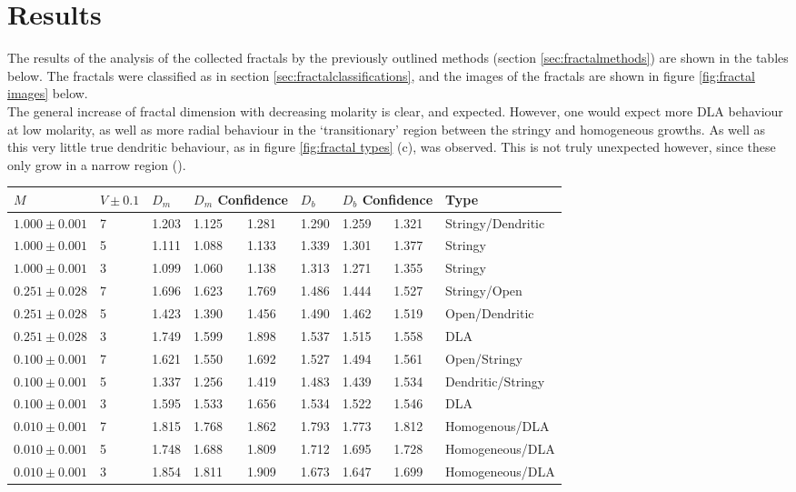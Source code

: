 \documentclass{article}
\theoremstyle{definition}
\theoremstyle{remark}
\begin{document}
\section{Results}
The results of the analysis of the collected fractals by the previously outlined methods (section \ref{sec:fractalmethods}) are shown in the tables below. The fractals were classified as in section \ref{sec:fractalclassifications}, and the images of the fractals are shown in figure \ref{fig:fractal images} below.\\
\indent The general increase of fractal dimension with decreasing molarity is clear, and expected. However, one would expect more DLA behaviour at low molarity, as well as more radial behaviour in the `transitionary' region between the stringy and homogeneous growths. As well as this very little true dendritic behaviour, as in figure \ref{fig:fractal types} (c), was observed. This is not truly unexpected however, since these only grow in a narrow region (\cite{PhysRevLett.56.1260}).\\
\begin{center}
\begin{tabular}{|l|l||l|l|l||l|l|l||l|}
        \hline
            $M$ & $V\pm0.1$ & $D_m$ & \multicolumn{2}{c|}{$D_m$ Confidence} & $D_b$ & \multicolumn{2}{c|}{$D_b$ Confidence} & Type \\ \hline
            $1.000\pm0.001$ & 7 & 1.203 & 1.125 & 1.281 & 1.290 & 1.259 & 1.321 & Stringy/Dendritic \\ \hline
            $1.000\pm0.001$ & 5 & 1.111 & 1.088 & 1.133 & 1.339 & 1.301 & 1.377 & Stringy \\ \hline
            $1.000\pm0.001$ & 3 & 1.099 & 1.060 & 1.138 & 1.313 & 1.271 & 1.355 & Stringy \\ \hline
            $0.251\pm0.028$ & 7 & 1.696 & 1.623 & 1.769 & 1.486 & 1.444 & 1.527 & Stringy/Open \\ \hline
            $0.251\pm0.028$ & 5 & 1.423 & 1.390 & 1.456 & 1.490 & 1.462 & 1.519 & Open/Dendritic \\ \hline
            $0.251\pm0.028$ & 3 & 1.749 & 1.599 & 1.898 & 1.537 & 1.515 & 1.558 & DLA \\ \hline
            $0.100\pm0.001$ & 7 & 1.621 & 1.550 & 1.692 & 1.527 & 1.494 & 1.561 & Open/Stringy \\ \hline
            $0.100\pm0.001$ & 5 & 1.337 & 1.256 & 1.419 & 1.483 & 1.439 & 1.534 & Dendritic/Stringy \\ \hline
            $0.100\pm0.001$ & 3 & 1.595 & 1.533 & 1.656 & 1.534 & 1.522 & 1.546 & DLA \\ \hline
            $0.010\pm0.001$ & 7 & 1.815 & 1.768 & 1.862 & 1.793 & 1.773 & 1.812 & Homogenous/DLA \\ \hline
            $0.010\pm0.001$ & 5 & 1.748 & 1.688 & 1.809 & 1.712 & 1.695 & 1.728 & Homogeneous/DLA \\ \hline
            $0.010\pm0.001$ & 3 & 1.854 & 1.811 & 1.909 & 1.673 & 1.647 & 1.699 & Homogeneous/DLA \\ \hline
\end{tabular}
\end{center}
\end{document}
